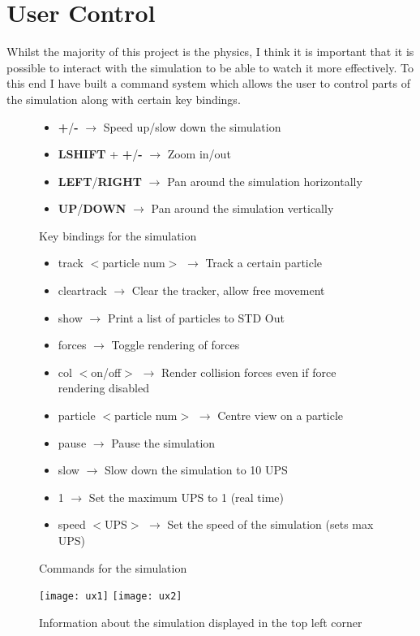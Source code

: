 \section{User Control}
	
	Whilst the majority of this project is the physics, I think it is important that it is possible to interact with the simulation to be able to watch it more effectively. To this end I have built a command system which allows the user to control parts of the simulation along with certain key bindings.
	
	\begin{figure}[h]
		\begin{itemize}
			\item \textbf{+}/\textbf{-} $\rightarrow$ Speed up/slow down the simulation
			\item \textbf{LSHIFT} + \textbf{+}/\textbf{-} $\rightarrow$ Zoom in/out
			\item \textbf{LEFT}/\textbf{RIGHT} $\rightarrow$ Pan around the simulation horizontally
			\item \textbf{UP}/\textbf{DOWN} $\rightarrow$ Pan around the simulation vertically
		\end{itemize}
		\caption{Key bindings for the simulation}
		\label{fig:keybindings}
	\end{figure}
	
	\begin{figure}[h]
		\begin{itemize}
			\item track $<$particle num$>$ $\rightarrow$ Track a certain particle
			\item cleartrack $\rightarrow$ Clear the tracker, allow free movement
			\item show $\rightarrow$ Print a list of particles to STD Out
			\item forces $\rightarrow$ Toggle rendering of forces
			\item col $<$on/off$>$ $\rightarrow$ Render collision forces even if force rendering disabled
			\item particle $<$particle num$>$ $\rightarrow$ Centre view on a particle
			\item pause $\rightarrow$ Pause the simulation
			\item slow $\rightarrow$ Slow down the simulation to 10 UPS
			\item 1 $\rightarrow$ Set the maximum UPS to 1 (real time)
			\item speed $<$UPS$>$ $\rightarrow$ Set the speed of the simulation (sets max UPS)
			
			
		\end{itemize}
		\caption{Commands for the simulation}
		\label{fig:commands}
	\end{figure}
	
	\begin{figure}
		\centering
		\texttt{[image: ux1]}
		\texttt{[image: ux2]}
		\caption{Information about the simulation displayed in the top left corner}
		\label{fig:uxImg1}
	\end{figure}
	
	